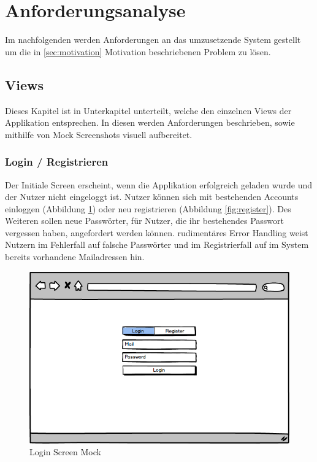 \section{Anforderungsanalyse}

Im nachfolgenden werden Anforderungen an das umzusetzende System gestellt um die in \ref{sec:motivation} Motivation beschriebenen Problem zu lösen.

\subsection{Views}

Dieses Kapitel ist in Unterkapitel unterteilt, welche den einzelnen Views der Applikation \projectname{} entsprechen.
In diesen werden Anforderungen beschrieben, sowie mithilfe von Mock Screenshots visuell aufbereitet.

\subsubsection{Login / Registrieren}

Der Initiale Screen erscheint, wenn die Applikation erfolgreich geladen wurde und der Nutzer nicht eingeloggt ist.
Nutzer können sich mit bestehenden Accounts einloggen (Abbildung \ref{fig:login}) oder neu registrieren (Abbildung \ref{fig:register}).
Des Weiteren sollen neue Passwörter, für Nutzer, die ihr bestehendes Passwort vergessen haben, angefordert werden können.
rudimentäres Error Handling weist Nutzern im Fehlerfall auf falsche Passwörter und im Registrierfall auf
im System bereits vorhandene Mailadressen hin.

\begin{figure}[h]
 \centering
 \includegraphics[width=0.7\linewidth]{kapitel1/mocks/Login.png}
 \caption{Login Screen Mock}
  \label{fig:login}
\end{figure}

